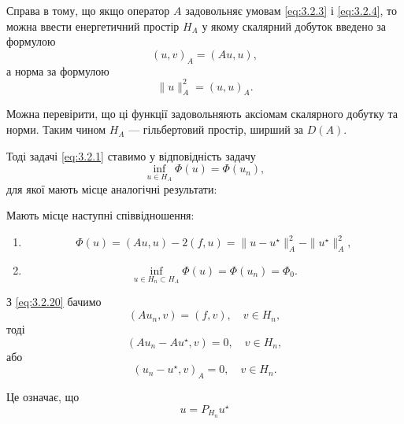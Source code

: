 Справа в тому, що якщо оператор $A$ задовольняє умовам \eqref{eq:3.2.3} і \eqref{eq:3.2.4}, то можна ввести енергетичний простір $H_A$ у якому скалярний добуток введено за формулою
\begin{equation}
    \label{eq:3.2.15}
    (u, v)_A = (A u, u),
\end{equation}
а норма за формулою
\begin{equation}
    \label{eq:3.2.16}
    \|u\|_A^2 = (u, u)_A.
\end{equation}

Можна перевірити, що ці функції задовольняють аксіомам скалярного добутку та норми. Таким чином $H_A$ --- гільбертовий простір, ширший за $D(A)$. \medskip

Тоді задачі \eqref{eq:3.2.1} ставимо у відповідність задачу
\begin{equation}
    \label{eq:3.2.18}
    \inf_{u \in H_A} \Phi(u) = \Phi(u_n),
\end{equation}
для якої мають місце аналогічні результати:

\begin{theorem}
    Мають місце наступні співвідношення:
    \begin{enumerate}
        \item \begin{equation}
            \label{eq:3.2.19}
            \Phi(u) = (A u, u) - 2 (f, u) = \|u - u^\star\|_A^2 - \|u^\star\|_A^2,
        \end{equation}
        \item \begin{equation}
            \label{eq:3.2.20}
            \inf_{u \in H_n \subset H_A} \Phi(u) = \Phi(u_n) = \Phi_0.
        \end{equation}
    \end{enumerate}
\end{theorem}

З \eqref{eq:3.2.20} бачимо
\begin{equation*}
    (A u_n, v) = (f, v), \quad v \in H_n,
\end{equation*}
тоді
\begin{equation*}
    (A u_n - A u^\star, v) = 0, \quad v \in H_n,
\end{equation*}
або
\begin{equation}
    \label{eq:3.2.21}
    (u_n - u^\star, v)_A = 0, \quad v \in H_n.
\end{equation}

Це означає, що
\begin{equation}
    \label{eq:3.2.22}
    u = P_{H_n} u^\star
\end{equation}

